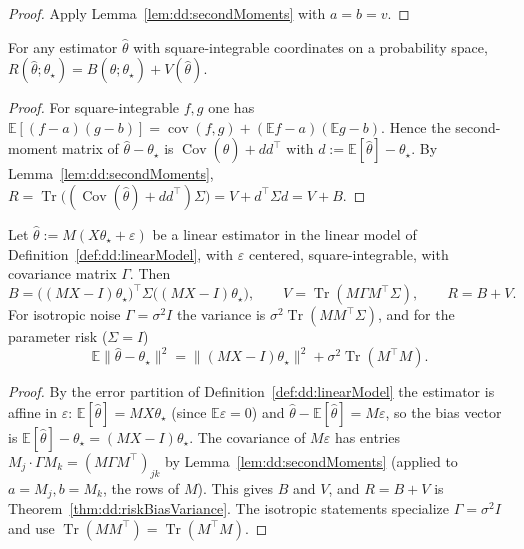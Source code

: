 \begin{proof}
  \leanok
Apply Lemma~\ref{lem:dd:secondMoments} with $a=b=v$.
\end{proof}

\begin{theorem}\label{thm:dd:riskBiasVariance}
  \leanok
For any estimator $\hat\theta$ with square-integrable coordinates on a probability space,
$R(\hat\theta;\theta_\star)=B(\hat\theta;\theta_\star)+V(\hat\theta)$.
\end{theorem}

\begin{proof}
  \leanok
For square-integrable $f,g$ one has $\mathbb E[(f-a)(g-b)]=\operatorname{cov}(f,g)+(\mathbb Ef-a)(\mathbb Eg-b)$. Hence the
second-moment matrix of $\hat\theta-\theta_\star$ is $\operatorname{Cov}(\hat\theta)+dd^\top$ with $d:=\mathbb E[\hat\theta]-\theta_\star$.
By Lemma~\ref{lem:dd:secondMoments}, $R=\operatorname{Tr}\bigl((\operatorname{Cov}(\hat\theta)+dd^\top)\Sigma\bigr)
=V+d^\top\Sigma d=V+B$.
\end{proof}

\begin{theorem}\label{thm:dd:linearBV}
  \leanok
Let $\hat\theta:=M(X\theta_\star+\varepsilon)$ be a linear estimator in the linear model of Definition~\ref{def:dd:linearModel}, with $\varepsilon$ centered, square-integrable, with covariance matrix $\Gamma$.
Then
\[
  B=\bigl((MX-I)\theta_\star\bigr)^\top\Sigma\bigl((MX-I)\theta_\star\bigr),\qquad
  V=\operatorname{Tr}(M\Gamma M^\top\Sigma),\qquad R=B+V .
\]
For isotropic noise $\Gamma=\sigma^2I$ the variance is $\sigma^2\operatorname{Tr}(MM^\top\Sigma)$, and for the parameter risk
($\Sigma=I$)
\[
  \mathbb E\|\hat\theta-\theta_\star\|^2=\|(MX-I)\theta_\star\|^2+\sigma^2\operatorname{Tr}(M^\top M).
\]
\end{theorem}

\begin{proof}
  \leanok
By the error partition of Definition~\ref{def:dd:linearModel} the estimator is affine in $\varepsilon$: $\mathbb E[\hat\theta]=MX\theta_\star$ (since $\mathbb E\varepsilon=0$) and
$\hat\theta-\mathbb E[\hat\theta]=M\varepsilon$, so the bias vector is $\mathbb E[\hat\theta]-\theta_\star=(MX-I)\theta_\star$. The covariance of $M\varepsilon$ has entries
$M_j\cdot\Gamma M_k=(M\Gamma M^\top)_{jk}$ by Lemma~\ref{lem:dd:secondMoments} (applied to $a=M_j,b=M_k$, the rows of $M$).
This gives $B$ and $V$, and $R=B+V$ is Theorem~\ref{thm:dd:riskBiasVariance}. The isotropic statements specialize
$\Gamma=\sigma^2I$ and use $\operatorname{Tr}(MM^\top)=\operatorname{Tr}(M^\top M)$.
\end{proof}

